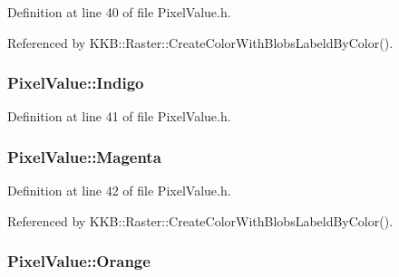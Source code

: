 Definition at line 40 of file Pixel\+Value.\+h.



Referenced by K\+K\+B\+::\+Raster\+::\+Create\+Color\+With\+Blobs\+Labeld\+By\+Color().

\subsubsection[{\texorpdfstring{Indigo}{Indigo}}]{ Pixel\+Value\+::\+Indigo\hspace{0.3cm}{\ttfamily [static]}}\hypertarget{class_k_k_b_1_1_pixel_value_a4019d9eba808e36449e32bdfdf1a4c38}{}\label{class_k_k_b_1_1_pixel_value_a4019d9eba808e36449e32bdfdf1a4c38}


Definition at line 41 of file Pixel\+Value.\+h.

\subsubsection[{\texorpdfstring{Magenta}{Magenta}}]{ Pixel\+Value\+::\+Magenta\hspace{0.3cm}{\ttfamily [static]}}\hypertarget{class_k_k_b_1_1_pixel_value_a39b5f23dae5d2065b943e5faa546879c}{}\label{class_k_k_b_1_1_pixel_value_a39b5f23dae5d2065b943e5faa546879c}


Definition at line 42 of file Pixel\+Value.\+h.



Referenced by K\+K\+B\+::\+Raster\+::\+Create\+Color\+With\+Blobs\+Labeld\+By\+Color().

\subsubsection[{\texorpdfstring{Orange}{Orange}}]{ Pixel\+Value\+::\+Orange\hspace{0.3cm}{\ttfamily [static]}}\hypertarget{class_k_k_b_1_1_pixel_value_adfa545c41c42b0a959e9e118a88a850b}{}\label{class_k_k_b_1_1_pixel_value_adfa545c41c42b0a959e9e118a88a850b}


